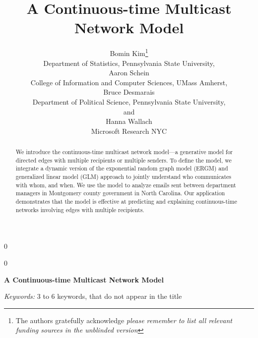 \documentclass[12pt]{article}
\newcommand{\blind}{0}
\begin{document}
\def\spacingset#1{\renewcommand{\baselinestretch}%
{#1}\small\normalsize} \spacingset{1}



\blind
{
  \title{\bf A Continuous-time Multicast \\Network Model}
  \author{Bomin Kim\thanks{
    The authors gratefully acknowledge \textit{please remember to list all relevant funding sources in the unblinded version}}\hspace{.2cm}\\
    Department of Statistics, Pennsylvania State University,\\
  Aaron Schein\\
  College of Information and Computer Sciences, UMass Amherst,\\
    Bruce Desmarais\\
    Department of Political Science, Pennsylvania State University,\\
    and\\
    Hanna Wallach\\
    Microsoft Research NYC}
  \maketitle
} \fi

\blind
{
  \bigskip
  \bigskip
  \bigskip
  \begin{center}
    {\LARGE\bf A Continuous-time Multicast Network Model}
\end{center}
  \medskip
} \fi

\bigskip
\begin{abstract}
We introduce the continuous-time multicast network model---a generative model for directed edges with multiple recipients or multiple senders. To define the model, we
integrate a dynamic version of the exponential random graph model (ERGM) and generalized linear model (GLM) approach to jointly understand who communicates with whom, and when. We use
the model to analyze emails sent between department managers in Montgomery county government in North Carolina. Our application demonstrates that the model is effective at predicting and explaining continuous-time networks involving edges with multiple recipients.
	\end{abstract}

\noindent%
{\it Keywords:}  3 to 6 keywords, that do not appear in the title
\vfill

\newpage
\spacingset{1.45} %
\end{document}
